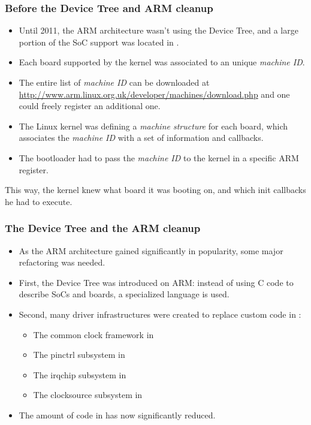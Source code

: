 \begin{frame}
  \frametitle{Before the Device Tree and ARM cleanup}
  \begin{itemize}
  \item Until 2011, the ARM architecture wasn't using the Device Tree,
    and a large portion of the SoC support was located in
    .
  \item Each board supported by the kernel was associated to an unique
    {\em machine ID}.
  \item The entire list of {\em machine ID} can be downloaded at
    \url{http://www.arm.linux.org.uk/developer/machines/download.php}
    and one could freely register an additional one.
  \item The Linux kernel was defining a {\em machine structure} for
    each board, which associates the {\em machine ID} with a set of
    information and callbacks.
  \item The bootloader had to pass the {\em machine ID} to the kernel
    in a specific ARM register.
  \end{itemize}
  This way, the kernel knew what board it was booting on,
  and which init callbacks he had to execute.
\end{frame}

\begin{frame}
  \frametitle{The Device Tree and the ARM cleanup}
  \begin{itemize}
  \item As the ARM architecture gained significantly in popularity,
    some major refactoring was needed.
  \item First, the Device Tree was introduced on ARM: instead of using
    C code to describe SoCs and boards, a specialized language is
    used.
  \item Second, many driver infrastructures were created to replace
    custom code in :
    \begin{itemize}
    \item The common clock framework in 
    \item The pinctrl subsystem in 
    \item The irqchip subsystem in 
    \item The clocksource subsystem in 
    \end{itemize}
  \item The amount of code in  has now significantly
    reduced.
  \end{itemize}
\end{frame}

